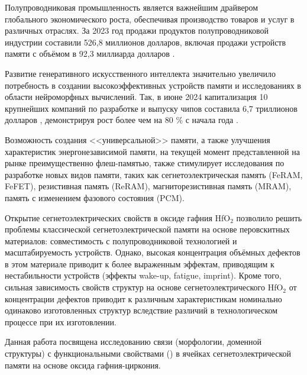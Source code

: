 
{\actuality} 

Полупроводниковая промышленность является важнейшим драйвером глобального экономического роста, обеспечивая производство товаров и услуг в различных отраслях. За 2023 год продажи продуктов полупроводниковой индустрии составили 526,8 миллионов долларов, включая продажи устройств памяти с объёмом в 92,3 миллиарда долларов \cite{danrossoGlobalSemiconductorSales2024}.

Развитие генеративного искусственного интеллекта значительно увеличило потребность в создании высокоэффективных устройств памяти и исследованиях в области нейроморфных вычислений. Так, в июне 2024 капитализация 10 крупнейших компаний по разработке и выпуску чипов составила 6,7 триллионов долларов \cite{LargestSemiconductorCompanies2024a}, демонстрируя рост более чем на 80 \% с начала года \cite{LargestSemiconductorCompanies2024}.

Возможность создания <<универсальной>> памяти, а также улучшения характеристик энергонезависимой памяти, на текущей момент представленной на рынке преимущественно флеш-памятью, также стимулирует исследования по разработке новых видов памяти, таких как сегнетоэлектрическая память (FeRAM, FeFET), резистивная память (ReRAM), магниторезистивная память (MRAM), память с изменением фазового состояния (PCM).

Открытие сегнетоэлектрических свойств в оксиде гафния HfO\(_2\) позволило решить проблемы классической сегнетоэлектрической памяти на основе перовскитных материалов: совместимость с полупроводниковой технологией и масштабируемость устройств. Однако, высокая концентрация объёмных дефектов в этом материале приводит к более выраженным эффектам, приводящим к нестабильности устройств (эффекты wake-up, fatigue, imprint). Кроме того, сильная зависимость свойств структур на основе сегнетоэлектрического HfO\(_2\) от концентрации дефектов приводит к различным характеристикам номинально одинаково изготовленных структур вследствие различий в технологическом процессе при их изготовлении.

Данная работа посвящена исследованию связи  (морфологии, доменной структуры) с функциональными свойствами () в ячейках сегнетоэлектрической памяти на основе оксида гафния-циркония.

